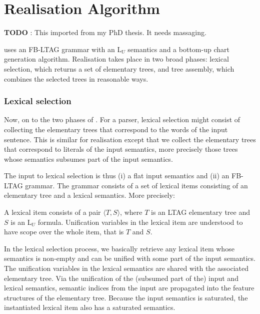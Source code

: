 %
\def\rulename#1#2{\multicolumn{1}{r#1}{\tiny (#2)}} %
\newcommand{\ellyou}{L$_U$\xspace}
\newcommand{\koweytautree}[1] {$\tau_{#1}$}
\newcommand{\koweynatlang}[1]{``#1''}
\newcommand{\koweytuple}[1]{\langle #1 \rangle}
\newcommand{\koweysemexpr}{\textit}

\chapter{Realisation Algorithm}
\label{cha:geni}

\textbf{TODO} : This imported from my PhD thesis.  It needs massaging.

\geni uses an FB-LTAG grammar with an \ellyou semantics and a bottom-up
chart generation algorithm.  Realisation takes place in two broad
phases: lexical selection, which returns a set of elementary trees, and
tree assembly, which combines the selected trees in reasonable ways.

\subsection{Lexical selection}
\label{sec:lexical-selection}

Now, on to the two phases of \geni.
For a parser, lexical selection might consist of collecting the
elementary trees that correspond to the words of the input sentence.
This is similar for realisation except that we collect the elementary
trees that correspond to literals of the input semantics, more precisely
those trees whose semantics subsumes part of the input semantics.

The input to lexical selection is thus (i) a flat input semantics and
(ii) an FB-LTAG grammar.  The grammar consists of a set of lexical items
consisting of an elementary tree and
a lexical semantics.  More precisely:
\begin{definition}\label{def:lexical-item}
A lexical item consists of a pair $\koweytuple{T,S}$, where $T$ is
an LTAG elementary tree and
$S$ is an \ellyou formula.  Unification variables in the lexical item
are understood to have scope over the whole item, that is $T$ and $S$.
\end{definition}

In the lexical selection process, we basically retrieve any lexical item
whose semantics is non-empty and can be unified with some part of the
input semantics.  The unification variables in the lexical semantics are
shared with the associated elementary tree.  Via the unification of the
(subsumed part of the) input and lexical semantics, semantic indices
from the input are propagated into the feature  structures of the
elementary tree.  Because the input semantics is saturated, the
instantiated lexical item also has a saturated semantics.

